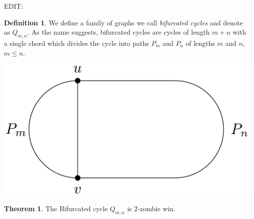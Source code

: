 \documentclass[letterpaper, 10pt]{article}
\begin{document}
\theoremstyle{definition}
\newtheorem{definition}{Definition}
\newtheorem{theorem}{Theorem}
\newtheorem{proposition}{Proposition}
\newtheorem{corollary}{Corollary}
\newtheorem{lemma}{Lemma}
\newtheorem{proofpart}{Part}
\makeatletter
{}
\makeatother
EDIT:


\begin{definition}
 We define a family of graphs we call \emph{bifurcated cycles} and denote as $Q_{m,n}$.
 As the name suggests, bifurcated cycles are cycles of length $m+n$ with a single chord
 which divides the cycle into paths $P_m$ and $P_n$ of lengths $m$ and $n$, $m \leq n$.
\end{definition}

\begin{center}
 \includegraphics[scale=0.20]{Q_m_n_basic}
\end{center}

\begin{theorem}
The Bifurcated cycle $Q_{m,n}$ is 2-zombie win.
\end{theorem}
\end{document}
